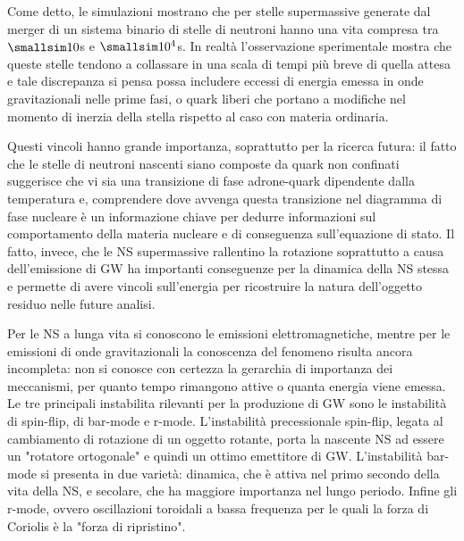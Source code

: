 Come detto, le simulazioni mostrano che per stelle supermassive generate dal merger di un sistema binario di stelle di neutroni hanno una vita compresa tra $\smallsim10$s e $\smallsim10^4$s. In realtà l'osservazione sperimentale mostra che queste stelle tendono a collassare in una scala di tempi più breve di quella attesa e tale discrepanza si pensa possa includere eccessi di energia emessa in onde gravitazionali nelle prime fasi, o quark liberi che portano a modifiche nel momento di inerzia della stella rispetto al caso con materia ordinaria.

Questi vincoli hanno grande importanza, soprattutto per la ricerca futura: il fatto che le stelle di neutroni nascenti siano composte da quark non confinati suggerisce che vi sia una transizione di fase adrone-quark dipendente dalla temperatura e, comprendere dove avvenga questa transizione nel diagramma di fase nucleare è un informazione chiave per dedurre informazioni sul comportamento della materia nucleare e di conseguenza sull'equazione di stato.
Il fatto, invece, che le NS supermassive rallentino la rotazione soprattutto a causa dell'emissione di GW ha importanti conseguenze per la dinamica della NS stessa e permette di avere vincoli sull'energia per ricostruire la natura dell'oggetto residuo nelle future analisi.

Per le NS a lunga vita si conoscono le emissioni elettromagnetiche, mentre per le emissioni di onde gravitazionali la conoscenza del fenomeno risulta ancora incompleta: non si conosce con certezza la gerarchia di importanza dei meccanismi, per quanto tempo rimangono attive o quanta energia viene emessa. Le tre principali instabilita rilevanti per la produzione di GW sono le instabilità di spin-flip, di bar-mode e r-mode.
L'instabilità precessionale spin-flip, legata al cambiamento di rotazione di un oggetto rotante, porta la nascente NS ad essere un "rotatore ortogonale" e quindi un ottimo emettitore di GW.
L'instabilità bar-mode si presenta in due varietà: dinamica, che è attiva nel primo secondo della vita della NS, e secolare, che ha maggiore importanza nel lungo periodo. 
Infine gli r-mode, ovvero oscillazioni toroidali a bassa frequenza per le quali la forza di Coriolis è la "forza di ripristino"\cite{sarin2020evolution}.